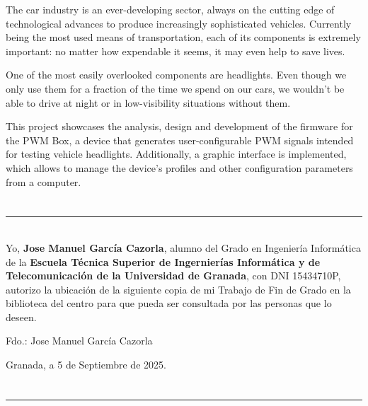 The car industry is an ever-developing sector, always on the cutting edge of technological advances to produce increasingly sophisticated vehicles. Currently being the most used means of transportation, each of its components is extremely important: no matter how expendable it seems, it may even help to save lives.

One of the most easily overlooked components are headlights. Even though we only use them for a fraction of the time we spend on our cars, we wouldn't be able to drive at night or in low-visibility situations without them.

This project showcases the analysis, design and development of the firmware for the PWM Box, a device that generates user-configurable PWM signals intended for testing vehicle headlights. Additionally, a graphic interface is implemented, which allows to manage the device's profiles and other configuration parameters from a computer.

\chapter*{}
\thispagestyle{empty}

\noindent\rule[-1ex]{\textwidth}{2px}\\[4.5ex]

Yo, \textbf{Jose Manuel García Cazorla}, alumno del Grado en Ingeniería Informática de la \textbf{Escuela Técnica Superior de Ingernierías Informática y de Telecomunicación de la Universidad de Granada}, con DNI 15434710P, autorizo la ubicación de la siguiente copia de mi Trabajo de Fin de Grado en la biblioteca del centro para que pueda ser consultada por las personas que lo deseen.

\vspace{6cm}

\noindent Fdo.: Jose Manuel García Cazorla

\vspace{2cm}

\begin{flushright}
    Granada, a 5 de Septiembre de 2025.
\end{flushright}

\chapter*{}
\thispagestyle{empty}

\noindent\rule[-1ex]{\textwidth}{2px}\\[4.5ex]

